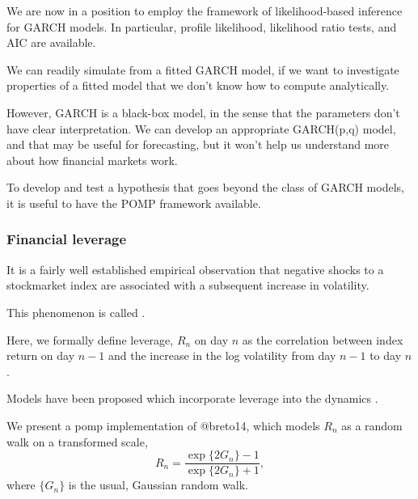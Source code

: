 \documentclass{beamer}\usepackage[]{graphicx}\usepackage[]{color}
\begin{document}
\begin{frame}[fragile]

\bi

\item We are now in a position to employ the framework of likelihood-based inference for GARCH models. In particular, profile likelihood, likelihood ratio tests, and AIC are available.

\item We can readily simulate from a fitted GARCH model, if we want to investigate properties of a fitted model that we don't know how to compute analytically.

\item However, GARCH is a black-box model, in the sense that the parameters don't have clear interpretation. We can develop an appropriate GARCH(p,q) model, and that may be useful for forecasting, but it won't help us understand more about how financial markets work. 

\item To develop and test a hypothesis that goes beyond the class of GARCH models, it is useful to have the POMP framework available.

\ei

\end{frame}


\begin{frame}[fragile]

\frametitle{Financial leverage}

\bi

\item It is a fairly well established empirical observation that negative shocks to a stockmarket index are associated with a subsequent increase in volatility. 

\item This phenomenon is called .

\item Here, we formally define leverage, $R_n$ on day $n$ as the correlation between index return on day $n-1$ and the increase in the log volatility from day $n-1$ to day $n$.

\item Models have been proposed which incorporate leverage into the dynamics \citep{breto14}.

\item We present a pomp implementation of @breto14, which models $R_n$ as a random walk on a transformed scale,
$$R_n= \frac{\exp\{2G_n\} -1}{\exp\{2G_n\}+1},$$
where $\{G_n\}$ is the usual, Gaussian random walk.

\ei

\end{frame}
\end{document}
